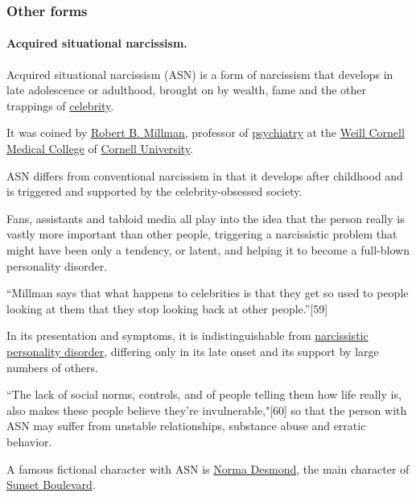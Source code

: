 \documentclass[oneside]{book}
\numberwithin{equation}{section}
\begin{document}
\subsubsection{Other forms}

\paragraph{Acquired situational narcissism.} Acquired situational narcissism (ASN) is a form of narcissism that develops in late adolescence or adulthood, brought on by wealth, fame and the other trappings of \href{https://en.wikipedia.org/wiki/Celebrity}{celebrity}.

It was coined by \href{https://en.wikipedia.org/wiki/Robert_Millman}{Robert B. Millman}, professor of \href{https://en.wikipedia.org/wiki/Psychiatry}{psychiatry} at the \href{https://en.wikipedia.org/wiki/Weill_Cornell_Medical_College}{Weill Cornell Medical College} of \href{https://en.wikipedia.org/wiki/Cornell_University}{Cornell University}.

ASN differs from conventional narcissism in that it develops after childhood and is triggered and supported by the celebrity-obsessed society.

Fans, assistants and tabloid media all play into the idea that the person really is vastly more important than other people, triggering a narcissistic problem that might have been only a tendency, or latent, and helping it to become a full-blown personality disorder.

``Millman says that what happens to celebrities is that they get so used to people looking at them that they stop looking back at other people.''[59]

In its presentation and symptoms, it is indistinguishable from \href{https://en.wikipedia.org/wiki/Narcissistic_personality_disorder}{narcissistic personality disorder}, differing only in its late onset and its support by large numbers of others.

``The lack of social norms, controls, and of people telling them how life really is, also makes these people believe they're invulnerable,"[60] so that the person with ASN may suffer from unstable relationships, substance abuse and erratic behavior.

A famous fictional character with ASN is \href{https://en.wikipedia.org/wiki/Norma_Desmond}{Norma Desmond}, the main character of \href{https://en.wikipedia.org/wiki/Sunset_Boulevard_(film)}{Sunset Boulevard}.
\end{document}
